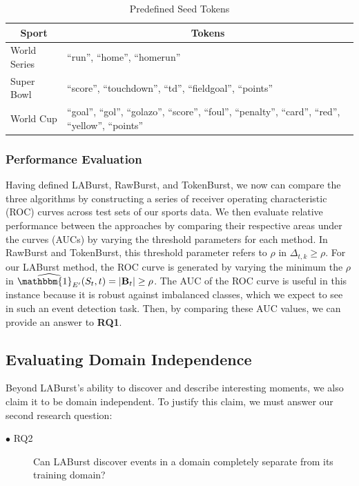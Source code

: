 \documentclass[letterpaper]{article}
\begin{document}
%
\begin{table}[htdp]
\caption{Predefined Seed Tokens}
\begin{center}
\begin{tabular}{|p{0.75in}|p{2.0in}|}
\hline
\multicolumn{1}{|c|}{\textbf{Sport}} & \multicolumn{1}{|c|}{\textbf{Tokens}} \\ \hline
World Series & ``run'', ``home'', ``homerun'' \\ \hline
Super Bowl & ``score'', ``touchdown'', ``td'', ``fieldgoal'', ``points'' \\ \hline
World Cup & ``goal'', ``gol'', ``golazo'', ``score'', ``foul'', ``penalty'', ``card'', ``red'', ``yellow'', ``points'' \\ \hline
\end{tabular}
\end{center}
\label{tab:targetTokens}
\end{table}

\subsubsection{Performance Evaluation}

Having defined LABurst, RawBurst, and TokenBurst, we now can compare the three algorithms by constructing a series of receiver operating characteristic (ROC) curves across test sets of our sports data.
We then evaluate relative performance between the approaches by comparing their respective areas under the curves (AUCs) by varying the threshold parameters for each method.
In RawBurst and TokenBurst, this threshold parameter refers to $\rho$ in $\Delta_{t, k} \ge \rho$.
For our LABurst method, the ROC curve is generated by varying the minimum the $\rho$ in $\widehat{\mathbbm{1}_{E'}}(S_t, t) = |\mathbf{B}_t| \ge \rho$.
The AUC of the ROC curve is useful in this instance because it is robust against imbalanced classes, which we expect to see in such an event detection task.
Then, by comparing these AUC values, we can provide an answer to \textbf{RQ1}.

\subsection{Evaluating Domain Independence}

Beyond LABurst's ability to discover and describe interesting moments, we also claim it to be domain independent.
To justify this claim, we must answer our second research question:
\begin{description}
\item[$\bullet$ RQ2] Can LABurst discover events in a domain completely separate from its training domain?
\end{description}
\end{document}
